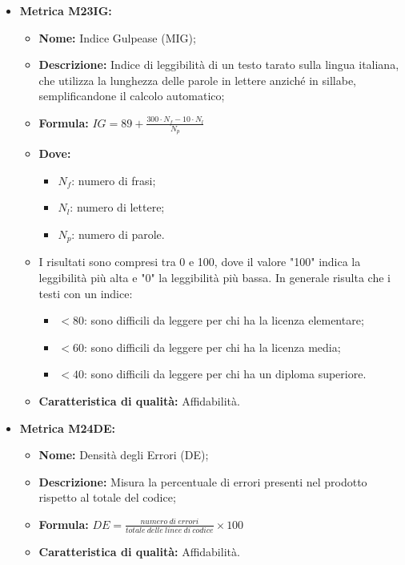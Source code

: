 \begin{itemize}
    \vspace{0.4cm}
    \item \hypertarget{item:M23IG}{\textbf{Metrica M23IG:}}
    \vspace{0.2cm}
    
    \begin{itemize}
        \item \textbf{Nome:} Indice Gulpease (MIG);
        \item \textbf{Descrizione:} Indice di leggibilità di un testo tarato sulla lingua italiana, che utilizza la lunghezza delle parole in lettere anziché in sillabe, semplificandone il calcolo automatico;
        \item \textbf{Formula:} $IG = 89 + \frac{300 \cdot N_f - 10 \cdot N_l}{N_p}$
        \item \textbf{Dove:}
            \begin{itemize}
                \item $N_f$: numero di frasi;
                \item $N_l$: numero di lettere;
                \item $N_p$: numero di parole.
            \end{itemize}
        \item I risultati sono compresi tra 0 e 100, dove il valore "100" indica la leggibilità più alta e "0" la leggibilità più bassa. In generale risulta che i testi con un indice:
            \begin{itemize}
                \item $< 80$: sono difficili da leggere per chi ha la licenza elementare;
                \item $< 60$: sono difficili da leggere per chi ha la licenza media;
                \item $< 40$: sono difficili da leggere per chi ha un diploma superiore.
            \end{itemize}
        \item \textbf{Caratteristica di qualità:} Affidabilità.
    \end{itemize}

    \vspace{0.4cm}
    \item \hypertarget{item:M23IG}{\textbf{Metrica M24DE:}}
    \vspace{0.2cm}
        
    \begin{minipage}[H]{0.9\textwidth}
        \begin{itemize}
            \item \textbf{Nome:} Densità degli Errori (DE);
            \item \textbf{Descrizione:} Misura la percentuale di errori presenti nel prodotto rispetto al totale del codice;
            \item \textbf{Formula:} $DE = \frac{numero \ di \ errori}{totale \ delle \ linee \ di \ codice} \times 100$
            \item \textbf{Caratteristica di qualità:} Affidabilità.
        \end{itemize}
    \end{minipage}



\end{itemize}
